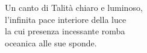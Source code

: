 \cleartorecto
\thispagestyle{empty}

\mbox{}
\vfill

{\centering



Un canto di Talità chiaro e luminoso,\\
l'infinita pace interiore della luce\\
la cui presenza incessante romba\\
oceanica alle sue sponde.

}

\vfill
\mbox{}


